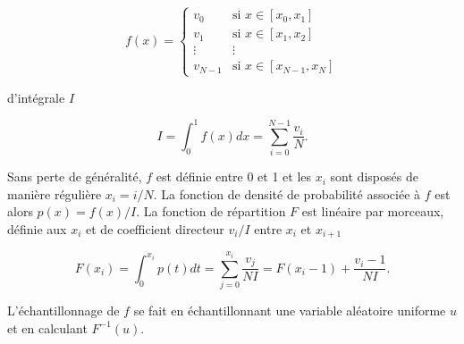 \begin{equation}
    f(x) = \left\{
        \begin{array}{ll}
            v_0 & \mbox{si } x \in [x_0, x_1] \\
            v_1 & \mbox{si } x \in [x_1, x_2] \\
            \vdots & \vdots \\
            v_{N-1} & \mbox{si } x \in [x_{N-1}, x_N]
        \end{array}
    \right.
\end{equation}

\noindent d'intégrale $I$

\begin{equation}
    I = \int_{0}^{1} f(x) dx = \sum_{i=0}^{N-1} \frac{v_i}N.
\end{equation}

Sans perte de généralité, $f$ est définie entre 0 et 1 et les $x_i$ sont disposés de manière régulière $x_i = i / N$. La fonction de densité de probabilité associée à $f$ est alors $p(x) = f(x) / I$. La fonction de répartition $F$ est linéaire par morceaux, définie aux $x_i$ et de coefficient directeur $v_i/I$ entre $x_i$ et $x_{i+1}$

\begin{equation}
    F(x_i) = \int_{0}^{x_i} p(t) dt = \sum_{j=0}^{x_i} \frac{v_j}{NI} = F(x_i-1) + \frac{v_i-1}{NI}.
\end{equation}

L'échantillonnage de $f$ se fait en échantillonnant une variable aléatoire uniforme $u$ et en calculant $F^{-1}(u)$.

\bigskip

%
%
%

